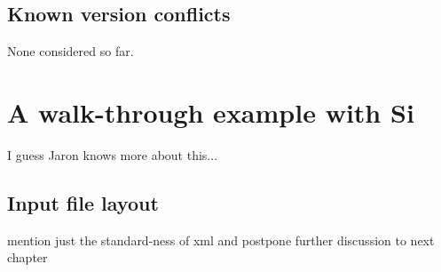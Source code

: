 
\subsection{Known version conflicts}
None considered so far.

\section{A walk-through example with Si}
I guess Jaron knows more about this...
\subsection{Input file layout}
mention just the standard-ness of xml and postpone further discussion to next chapter
